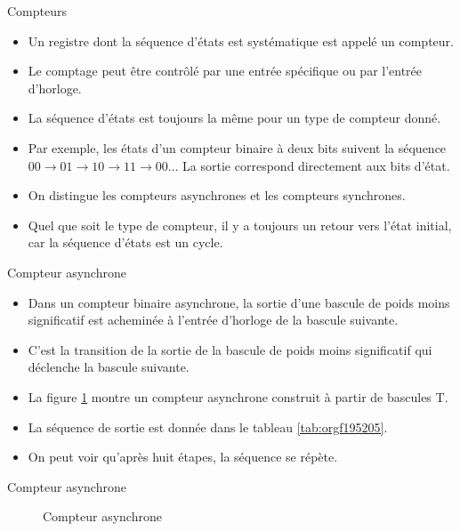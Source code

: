 \documentclass[presentation]{beamer}
\begin{document}
\begin{frame}[label={sec:org9d6ee7e}]{Compteurs}
\begin{itemize}
\item Un registre dont la séquence d'états est systématique est appelé un \alert{compteur}.

\item Le comptage peut être contrôlé par une entrée spécifique ou par l'entrée d'horloge.

\item La séquence d'états est toujours la même pour un type de compteur donné.

\item Par exemple, les états d'un compteur binaire à deux bits suivent la séquence \(00 \rightarrow 01 \rightarrow 10 \rightarrow 11 \rightarrow 00 \ldots\) La sortie correspond directement aux bits d'état.

\item On distingue les compteurs \alert{asynchrones} et les compteurs \alert{synchrones}.

\item Quel que soit le type de compteur, il y a toujours un retour vers l'état initial, car la séquence d'états est un cycle.
\end{itemize}
\end{frame}

\begin{frame}[label={sec:orgb26f25f}]{Compteur asynchrone}
\begin{itemize}
\item Dans un compteur binaire asynchrone, la sortie d'une bascule de poids moins significatif est acheminée à l'entrée d'horloge de la bascule suivante.

\item C'est la transition de la sortie de la bascule de poids moins significatif qui déclenche la bascule suivante.

\item La figure \ref{fig:orgb34ab73} montre un compteur asynchrone construit à partir de bascules T.

\item La séquence de sortie est donnée dans le tableau \ref{tab:orgf195205}.

\item On peut voir qu'après huit étapes, la séquence se répète.
\end{itemize}
\end{frame}

\begin{frame}[label={sec:org76163f7}]{Compteur asynchrone}
\begin{figure}[htbp]
\centering

\caption{\label{fig:orgb34ab73}Compteur asynchrone}
\end{figure}
\end{frame}
\end{document}
